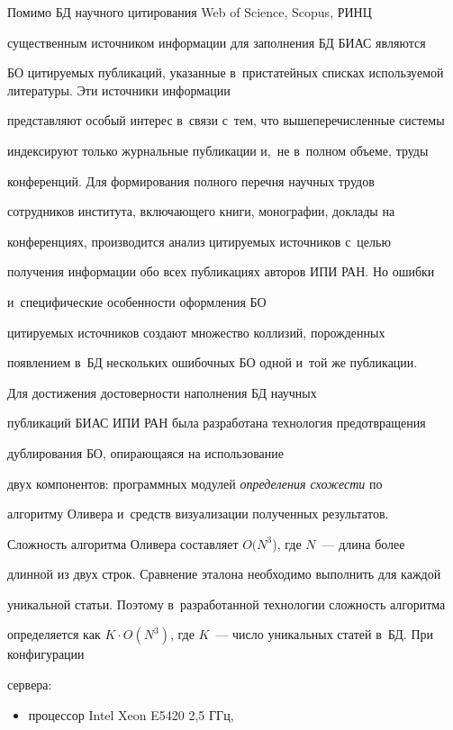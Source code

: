 {  Помимо БД научного цитирования Web of Science, Scopus, РИНЦ


существенным источником информации для заполнения БД БИАС являются


БО цитируемых публикаций, указанные в~пристатейных списках используемой литературы. Эти источники информации


представляют особый интерес в~связи с~тем, что вышеперечисленные системы


индексируют только журнальные публикации и,~не в~полном объеме, труды


конференций. Для формирования полного перечня научных трудов


сотрудников института, включающего книги, монографии, доклады на


конференциях, производится анализ цитируемых источников с~целью


получения информации обо всех публикациях авторов ИПИ РАН. Но ошибки


и~специфические особенности оформления БО


цитируемых источников создают множество коллизий, порожденных


появлением в~БД нескольких ошибочных БО одной и~той же публикации.





  Для достижения достоверности наполнения БД научных


публикаций БИАС ИПИ РАН была разработана технология предотвращения


дуб\-ли\-ро\-ва\-ния БО, опирающаяся на использование


двух компонентов: программных модулей \textit{определения схожести} по


алгоритму Оливера и~средств визуализации полученных результатов.


Сложность алгоритма Оливера составляет $O(N^3$), где $N$~--- длина более


длинной из двух строк. Сравнение эталона необходимо выполнить для каждой


уникальной статьи. Поэтому в~разработанной технологии сложность алгоритма


определяется как $K\cdot O(N^3)$, где $K$~--- число уникальных статей в~БД. При конфигурации


сервера:


  \begin{itemize}


\item процессор Intel Xeon E5420 2,5 ГГц,



\end{itemize}}
